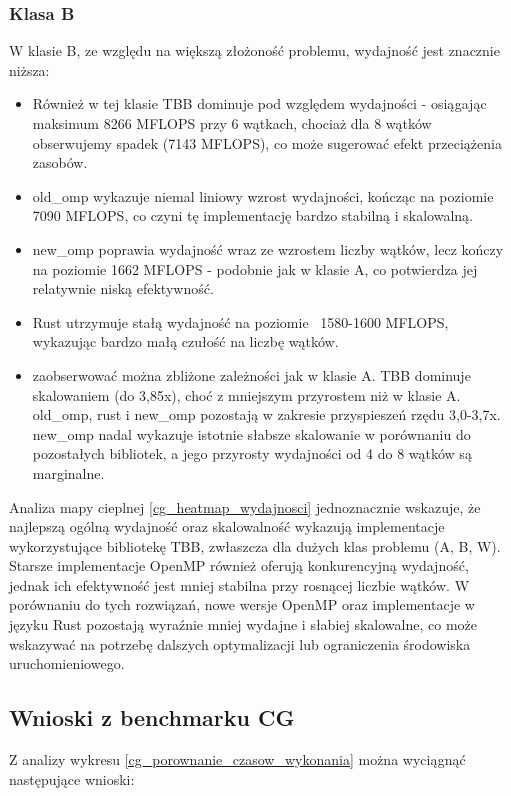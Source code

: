 \subsubsection{Klasa B}
W klasie B, ze względu na większą złożoność problemu, wydajność jest znacznie niższa:
\begin{itemize}
    \item Również w tej klasie TBB dominuje pod względem wydajności - osiągając maksimum 8266 MFLOPS przy 6 wątkach, chociaż dla 8 wątków obserwujemy spadek (7143 MFLOPS), co może sugerować efekt przeciążenia zasobów.
    \item old\_omp wykazuje niemal liniowy wzrost wydajności, kończąc na poziomie 7090 MFLOPS, co czyni tę implementację bardzo stabilną i skalowalną.
    \item new\_omp poprawia wydajność wraz ze wzrostem liczby wątków, lecz kończy na poziomie 1662 MFLOPS - podobnie jak w klasie A, co potwierdza jej relatywnie niską efektywność.
    \item Rust utrzymuje stałą wydajność na poziomie ~1580-1600 MFLOPS, wykazując bardzo małą czułość na liczbę wątków.
    \item zaobserwować można zbliżone zależności jak w klasie A. TBB dominuje skalowaniem (do 3,85x), choć z mniejszym przyrostem niż w klasie A. old\_omp, rust i new\_omp pozostają w zakresie przyspieszeń rzędu 3,0-3,7x. new\_omp nadal wykazuje istotnie słabsze skalowanie w porównaniu do pozostałych bibliotek, a jego przyrosty wydajności od 4 do 8 wątków są marginalne.
\end{itemize}

Analiza mapy cieplnej \ref{cg_heatmap_wydajnosci} jednoznacznie wskazuje, że najlepszą ogólną wydajność oraz skalowalność wykazują implementacje wykorzystujące bibliotekę TBB, zwłaszcza dla dużych klas problemu (A, B, W). Starsze implementacje OpenMP również oferują konkurencyjną wydajność, jednak ich efektywność jest mniej stabilna przy rosnącej liczbie wątków. W porównaniu do tych rozwiązań, nowe wersje OpenMP oraz implementacje w języku Rust pozostają wyraźnie mniej wydajne i słabiej skalowalne, co może wskazywać na potrzebę dalszych optymalizacji lub ograniczenia środowiska uruchomieniowego.


\subsection{Wnioski z benchmarku CG}
Z analizy wykresu \ref{cg_porownanie_czasow_wykonania} można wyciągnąć następujące wnioski:

